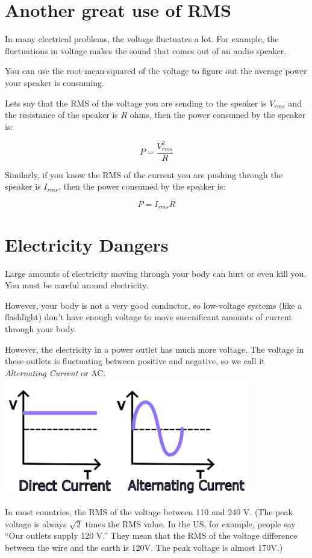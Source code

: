 \section{Another great use of RMS}

In many electrical problems, the voltage fluctuates a lot.  For
example, the fluctuations in voltage makes the sound that comes out of an
audio speaker.

You can use the root-mean-squared of the voltage to figure out the average power
your speaker is consuming.

Lets say that the RMS of the voltage you are sending to the speaker is $V_{rms}$
and the resistance of the speaker is $R$ ohms, then the power consumed
by the speaker is:

$$P = \frac{V_{rms}^2}{R}$$

Similarly, if you know the RMS of the current you are pushing through
the speaker is $I_{rms}$, then the power consumed by the speaker is:

$$P = I_{rms} R$$

\section{Electricity Dangers}

Large amounts of electricity moving through your body can hurt or even kill
you. You must be careful around electricity.

However, your body is not a very good conductor, so low-voltage
systems (like a flashlight) don't have enough voltage to move succnificant amounts of
current through your body.

However, the  electricity in a power outlet has much more voltage. The voltage
in these outlets is fluctuating between positive and negative, so we
call it \textit{Alternating Current} or AC.
\includegraphics[width=0.8\textwidth]{AC_vs_DC.png}

In most countries, the RMS of the voltage between 110 and 240 V. (The
peak voltage is always $\sqrt{2}$ times the RMS value. In the US, for
example, people say ``Our outlets supply 120 V.'' They mean that the
RMS of the voltage difference between the wire and the earth is 120V.
The peak voltage is almost 170V.)


